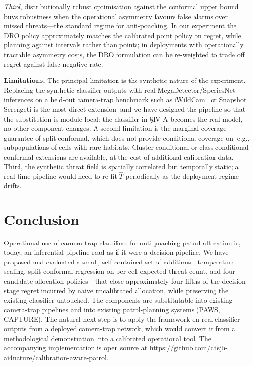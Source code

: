 \documentclass[conference]{IEEEtran}
\begin{document}
\emph{Third}, distributionally robust optimisation against the
conformal upper bound buys robustness when the operational asymmetry
favours false alarms over missed threats---the standard regime for
anti-poaching. In our experiment the DRO policy approximately matches
the calibrated point policy on regret, while planning against intervals
rather than points; in deployments with operationally tractable
asymmetry costs, the DRO formulation can be re-weighted to trade off
regret against false-negative rate.

\textbf{Limitations.} The principal limitation is the synthetic nature
of the experiment. Replacing the synthetic classifier outputs with
real MegaDetector/SpeciesNet inferences on a held-out camera-trap
benchmark such as iWildCam~\cite{beery2020iwildcam} or Snapshot
Serengeti is the most direct extension, and we have designed the
pipeline so that the substitution is module-local: the classifier in
\S{}IV-A becomes the real model, no other component changes. A second
limitation is the marginal-coverage guarantee of split conformal,
which does not provide conditional coverage on, e.g., subpopulations
of cells with rare habitats. Cluster-conditional or class-conditional
conformal extensions are available, at the cost of additional
calibration data. Third, the synthetic threat field is spatially
correlated but temporally static; a real-time pipeline would need to
re-fit $\hat T$ periodically as the deployment regime drifts.

\section{Conclusion}

Operational use of camera-trap classifiers for anti-poaching patrol
allocation is, today, an inferential pipeline read as if it were a
decision pipeline. We have proposed and evaluated a small,
self-contained set of additions---temperature scaling, split-conformal
regression on per-cell expected threat count, and four candidate
allocation policies---that close approximately four-fifths of the
decision-stage regret incurred by naive uncalibrated allocation, while
preserving the existing classifier untouched. The components are
substitutable into existing camera-trap pipelines and into existing
patrol-planning systems (PAWS, CAPTURE). The natural next step is to
apply the framework on real classifier outputs from a deployed
camera-trap network, which would convert it from a methodological
demonstration into a calibrated operational tool. The accompanying
implementation is open source at
\url{https://github.com/cdsj5-ai4nature/calibration-aware-patrol}.
\end{document}
